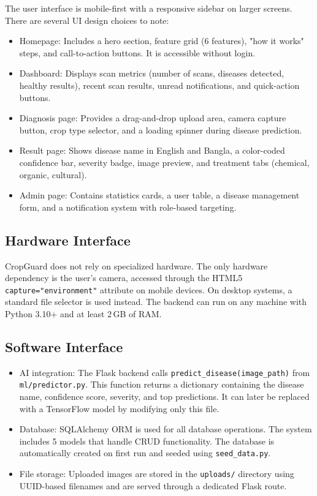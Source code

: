 \documentclass[12pt,a4paper]{article}
\begin{document}
The user interface is mobile-first with a responsive sidebar on larger screens. There are several UI design choices to note:

\begin{itemize}[leftmargin=2em]
  \item Homepage: Includes a hero section, feature grid (6 features), "how it works" steps, and call-to-action buttons. It is accessible without login.
  \item Dashboard: Displays scan metrics (number of scans, diseases detected, healthy results), recent scan results, unread notifications, and quick-action buttons.
  \item Diagnosis page: Provides a drag-and-drop upload area, camera capture button, crop type selector, and a loading spinner during disease prediction.
  \item Result page: Shows disease name in English and Bangla, a color-coded confidence bar, severity badge, image preview, and treatment tabs (chemical, organic, cultural).
  \item Admin page: Contains statistics cards, a user table, a disease management form, and a notification system with role-based targeting.
\end{itemize}

\subsection{Hardware Interface}

CropGuard does not rely on specialized hardware. The only hardware dependency is the user's camera, accessed through the HTML5 \texttt{capture="environment"} attribute on mobile devices. On desktop systems, a standard file selector is used instead. The backend can run on any machine with Python 3.10+ and at least 2\,GB of RAM.

\subsection{Software Interface}

\begin{itemize}[leftmargin=2em]
  \item AI integration: The Flask backend calls \texttt{predict\_disease(image\_path)} from \texttt{ml/predictor.py}. This function returns a dictionary containing the disease name, confidence score, severity, and top predictions. It can later be replaced with a TensorFlow model by modifying only this file.
  
  \item Database: SQLAlchemy ORM is used for all database operations. The system includes 5 models that handle CRUD functionality. The database is automatically created on first run and seeded using \texttt{seed\_data.py}.
  
  \item File storage: Uploaded images are stored in the \texttt{uploads/} directory using UUID-based filenames and are served through a dedicated Flask route.
\end{itemize}
\end{document}
